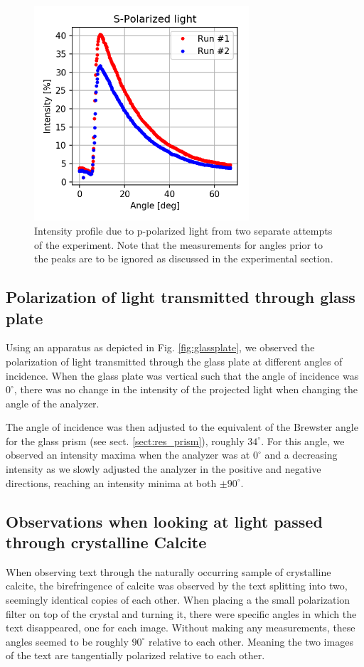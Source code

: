\documentclass[11pt,a4paper, twocolumn]{article}
\begin{document}
  \begin{figure}[H]
    \center
    \includegraphics[width=8cm]{scripts/spolar.png}
    \caption{Intensity profile due to p-polarized light from two separate attempts of the experiment. Note that the measurements for angles prior to the peaks are to be ignored as discussed in the experimental section.}
    \label{fig:spolar}
  \end{figure}

  \subsection{Polarization of light transmitted through glass plate}
    Using an apparatus as depicted in Fig. \ref{fig:glassplate}, we observed the polarization of light transmitted through the glass plate at different angles of incidence. When the glass plate was vertical such that the angle of incidence was $0^\circ$, there was no change in the intensity of the projected light when changing the angle of the analyzer. 

    The angle of incidence was then adjusted to the equivalent of the Brewster angle for the glass prism (see sect. \ref{sect:res_prism}), roughly $34^\circ$. For this angle, we observed an intensity maxima when the analyzer was at $0^\circ$ and a decreasing intensity as we slowly adjusted the analyzer in the positive and negative directions, reaching an intensity minima at both $\pm 90^\circ$. 

  \subsection{Observations when looking at light passed through crystalline Calcite}
    When observing text through the naturally occurring sample of crystalline calcite, the birefringence of calcite was observed by the text splitting into two, seemingly identical copies of each other. When placing a the small polarization filter on top of the crystal and turning it, there were specific angles in which the text disappeared, one for each image. Without making any measurements, these angles seemed to be roughly $90^\circ$ relative to each other. Meaning the two images of the text are tangentially polarized relative to each other. 
\end{document}
